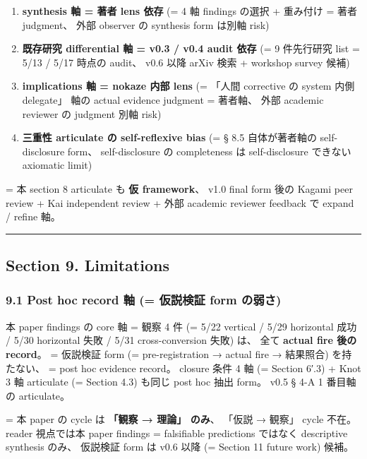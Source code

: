 \documentclass[
]{article}
\providecommand{\tightlist}{%
  \setlength{\itemsep}{0pt}\setlength{\parskip}{0pt}}
\begin{document}
\begin{enumerate}
\def\labelenumi{\arabic{enumi}.}
\tightlist
\item
  \textbf{synthesis 軸 = 著者 lens 依存} (= 4 軸 findings の選択 +
  重み付け = 著者 judgment、 外部 observer の synthesis form は別軸
  risk)
\item
  \textbf{既存研究 differential 軸 = v0.3 / v0.4 audit 依存} (= 9
  件先行研究 list = 5/13 / 5/17 時点の audit、 v0.6 以降 arXiv 検索 +
  workshop survey 候補)
\item
  \textbf{implications 軸 = nokaze 内部 lens} (= 「人間 corrective の
  system 内側 delegate」 軸の actual evidence judgment = 著者軸、 外部
  academic reviewer の judgment 別軸 risk)
\item
  \textbf{三重性 articulate の self-reflexive bias} (= § 8.5
  自体が著者軸の self-disclosure form、 self-disclosure の completeness
  は self-disclosure できない axiomatic limit)
\end{enumerate}

= 本 section 8 articulate も \textbf{仮 framework}、 v1.0 final form
後の Kagami peer review + Kai independent review + 外部 academic
reviewer feedback で expand / refine 軸。

\begin{center}\rule{0.5\linewidth}{0.5pt}\end{center}

\subsection{Section 9. Limitations}\label{section-9.-limitations}

\subsubsection{9.1 Post hoc record 軸 (= 仮説検証 form
の弱さ)}\label{post-hoc-record-ux8ef8-ux4eeeux8aacux691cux8a3c-form-ux306eux5f31ux3055}

本 paper findings の core 軸 = 観察 4 件 (= 5/22 vertical / 5/29
horizontal 成功 / 5/30 horizontal 失敗 / 5/31 cross-conversion 失敗)
は、 全て \textbf{actual fire 後の record}。 = 仮説検証 form (=
pre-registration → actual fire → 結果照合) を持たない、 = post hoc
evidence record。 closure 条件 4 軸 (= Section 6′.3) + Knot 3 軸
articulate (= Section 4.3) も同じ post hoc 抽出 form。 v0.5 § 4-A 1
番目軸の articulate。

= 本 paper の cycle は \textbf{「観察 → 理論」 のみ}、 「仮説 → 観察」
cycle 不在。 reader 視点では本 paper findings = falsifiable predictions
ではなく descriptive synthesis のみ、 仮説検証 form は v0.6 以降 (=
Section 11 future work) 候補。
\end{document}
